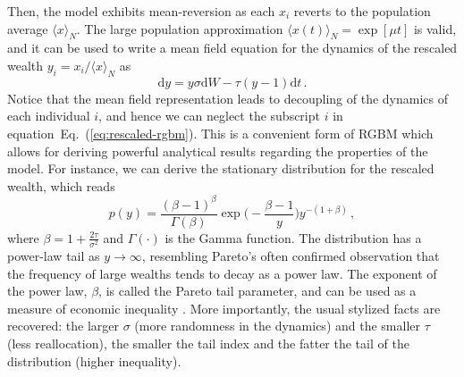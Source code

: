 \documentclass[11pt]{article}
\newcommand{\eref}[1]{Eq.~(\ref{eq:#1})}
\newcommand{\be}{\begin{equation}}
\newcommand{\ee}{\end{equation}}
\numberwithin{equation}{section}
\begin{document}
Then, the model exhibits mean-reversion as each $x_i$ reverts to the population average $\langle x \rangle_N$. The large population approximation $\langle x(t) \rangle_N = \exp \left[\mu t\right]$ is valid, and it can be used to write a mean field equation for the dynamics of the rescaled wealth $y_i = x_i / \langle x \rangle_N$ as
%
\be
    \mathrm{d} y =   y \sigma  \mathrm{d} W - \tau (y - 1)  \mathrm{d}t\,.
    \label{eq:rescaled-rgbm}
\ee
%
Notice that the mean field representation leads to decoupling of the dynamics of each individual $i$, and hence we can neglect the subscript $i$ in equation~\eref{rescaled-rgbm}. This is a convenient form of RGBM which allows for deriving powerful analytical results regarding the properties of the model. For instance, we can derive the stationary distribution for the rescaled wealth, which reads
%
\be
p(y) = \frac{(\beta - 1)^{\beta}}{\Gamma(\beta)} \exp{\big(-\frac{\beta - 1}{y}\big)} y^{-(1+\beta)}\,,
\label{eq:rgbm-stationary-distribution}
\ee
%
where $\beta = 1 + \frac{2 \tau}{\sigma^2}$ and $\Gamma(\cdot)$ is the Gamma function. The distribution has a power-law tail as $y \to \infty$, resembling Pareto's often confirmed observation that the frequency of large wealths tends to decay as a power law. The exponent of the power law, $\beta$, is called the Pareto tail parameter, and can be used as a measure of economic inequality \citep{Cowell2011}. More importantly, the usual stylized facts are recovered: the larger $\sigma$ (more randomness in the dynamics) and the smaller $\tau$ (less reallocation), the smaller the tail index and the fatter the tail of the distribution (higher inequality).
\end{document}
